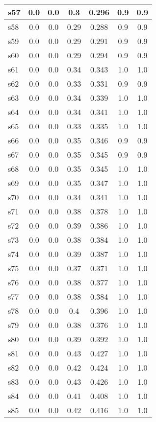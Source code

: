 \documentclass{article}
\begin{document}
\begin{tabular}{|l|c|c|c|c|c|c|}
\hline
s57 &0.0 & 0.0 & 0.3 & 0.296 & 0.9 & 0.9\\
\hline
s58 &0.0 & 0.0 & 0.29 & 0.288 & 0.9 & 0.9\\
\hline
s59 &0.0 & 0.0 & 0.29 & 0.291 & 0.9 & 0.9\\
\hline
s60 &0.0 & 0.0 & 0.29 & 0.294 & 0.9 & 0.9\\
\hline
s61 &0.0 & 0.0 & 0.34 & 0.343 & 1.0 & 1.0\\
\hline
s62 &0.0 & 0.0 & 0.33 & 0.331 & 0.9 & 0.9\\
\hline
s63 &0.0 & 0.0 & 0.34 & 0.339 & 1.0 & 1.0\\
\hline
s64 &0.0 & 0.0 & 0.34 & 0.341 & 1.0 & 1.0\\
\hline
s65 &0.0 & 0.0 & 0.33 & 0.335 & 1.0 & 1.0\\
\hline
s66 &0.0 & 0.0 & 0.35 & 0.346 & 0.9 & 0.9\\
\hline
s67 &0.0 & 0.0 & 0.35 & 0.345 & 0.9 & 0.9\\
\hline
s68 &0.0 & 0.0 & 0.35 & 0.345 & 1.0 & 1.0\\
\hline
s69 &0.0 & 0.0 & 0.35 & 0.347 & 1.0 & 1.0\\
\hline
s70 &0.0 & 0.0 & 0.34 & 0.341 & 1.0 & 1.0\\
\hline
s71 &0.0 & 0.0 & 0.38 & 0.378 & 1.0 & 1.0\\
\hline
s72 &0.0 & 0.0 & 0.39 & 0.386 & 1.0 & 1.0\\
\hline
s73 &0.0 & 0.0 & 0.38 & 0.384 & 1.0 & 1.0\\
\hline
s74 &0.0 & 0.0 & 0.39 & 0.387 & 1.0 & 1.0\\
\hline
s75 &0.0 & 0.0 & 0.37 & 0.371 & 1.0 & 1.0\\
\hline
s76 &0.0 & 0.0 & 0.38 & 0.377 & 1.0 & 1.0\\
\hline
s77 &0.0 & 0.0 & 0.38 & 0.384 & 1.0 & 1.0\\
\hline
s78 &0.0 & 0.0 & 0.4 & 0.396 & 1.0 & 1.0\\
\hline
s79 &0.0 & 0.0 & 0.38 & 0.376 & 1.0 & 1.0\\
\hline
s80 &0.0 & 0.0 & 0.39 & 0.392 & 1.0 & 1.0\\
\hline
s81 &0.0 & 0.0 & 0.43 & 0.427 & 1.0 & 1.0\\
\hline
s82 &0.0 & 0.0 & 0.42 & 0.424 & 1.0 & 1.0\\
\hline
s83 &0.0 & 0.0 & 0.43 & 0.426 & 1.0 & 1.0\\
\hline
s84 &0.0 & 0.0 & 0.41 & 0.408 & 1.0 & 1.0\\
\hline
s85 &0.0 & 0.0 & 0.42 & 0.416 & 1.0 & 1.0\\

\end{tabular}
\end{document}
